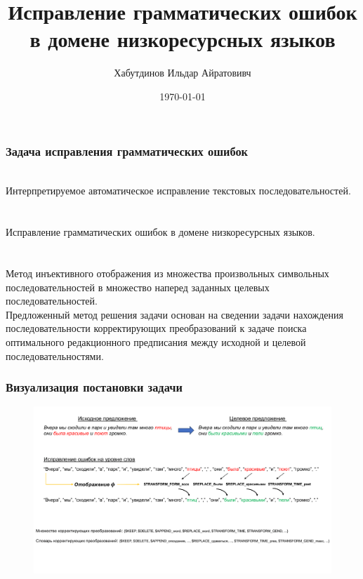 \documentclass[10pt]{beamer}
\title[]{Исправление грамматических ошибок в домене низкоресурсных языков } %
\author{Хабутдинов Ильдар Айратовивч} %
\institute[МФТИ] %
{
Научный руководитель: к.ф.-м.н. А. В. Грабовой \\
Московский Физико-Технический Институт \\ %
\medskip
\textit{} %
}
\date{\today} %
\begin{document}
\begin{frame}
\titlepage %
\end{frame}

\begin{frame}
\frametitle{Задача исправления грамматических ошибок } %
\justifying
{\color{blue}{Проблема}} \\
Интерпретируемое автоматическое исправление текстовых последовательностей. \\
~\\
{\color{blue}{Задача}} \\
Исправление грамматических ошибок в домене низкоресурсных языков. \\
~\\
{\color{blue}{Метод решения}} \\
Метод инъективного отображения из множества произвольных символьных последовательностей в множество наперед заданных целевых последовательностей. 
~\\
Предложенный метод решения задачи основан на сведении задачи нахождения последовательности корректирующих преобразований к задаче поиска оптимального редакционного предписания  между исходной и целевой последовательностями.



\end{frame}


\begin{frame}
\frametitle{Визуализация постановки задачи}


\begin{figure}[h]
    \centering
    \includegraphics[width=1.0\textwidth]{picture-1.png} %
\end{figure}


\end{frame}
\end{document}
